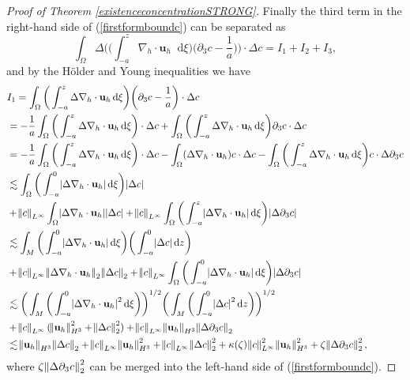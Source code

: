 \documentclass[11pt, a4paper]{article}
\newcommand*\diff{\mathop{}\!\mathrm{d}}
\begin{document}
\begin{proof}[Proof of Theorem \ref{existenceconcentrationSTRONG}]
Finally the third term in the right-hand side of (\ref{firstformboundc}) can be separated as
%
$$\int_\Omega \Delta \bigg ( \bigg ( \int_{-a}^z \nabla_h \cdot \mathbf{u}_h \diff \xi \bigg) \bigg ( \partial_3 c - \frac{1}{a}\bigg) \bigg ) \cdot \Delta c = I_1 + I_2 + I_3,$$
%
and by the H\"older and Young inequalities we have
%
\begin{equation} \label{term3estimateGE_1}
\begin{split}
& I_1 = \int_\Omega \bigg ( \int_{-a}^z \Delta \nabla_h \cdot \mathbf{u}_h \diff \xi \bigg) \bigg ( \partial_3 c - \frac{1}{a}\bigg) \cdot \Delta c \\
& = - \frac{1}{a} \int_\Omega \bigg ( \int_{-a}^z \Delta \nabla_h \cdot \mathbf{u}_h \diff \xi \bigg) \cdot \Delta c + \int_\Omega \bigg ( \int_{-a}^z \Delta \nabla_h \cdot \mathbf{u}_h \diff \xi \bigg) \partial_3 c \cdot \Delta c \\
& = - \frac{1}{a} \int_\Omega \bigg ( \int_{-a}^z \Delta \nabla_h \cdot \mathbf{u}_h \diff \xi \bigg) \cdot \Delta c - \int_\Omega (\Delta \nabla_h \cdot \mathbf{u}_h) c \cdot \Delta c - \int_\Omega \bigg ( \int_{-a}^z \Delta \nabla_h \cdot \mathbf{u}_h \diff \xi \bigg) c \cdot \Delta \partial_3 c \\
& \lesssim \int_\Omega \bigg ( \int_{-a}^0 \abs{\Delta \nabla_h \cdot \mathbf{u}_h} \diff \xi \bigg) \abs{\Delta c} \\
& + \norm{c}_{L^\infty} \int_\Omega \abs{\Delta \nabla_h \cdot \mathbf{u}_h} \abs{\Delta c} + \norm{c}_{L^\infty} \int_\Omega \bigg ( \int_{-a}^z \abs{ \Delta \nabla_h \cdot \mathbf{u}_h} \diff \xi \bigg) \abs{\Delta \partial_3 c} \\
& \lesssim \int_M \bigg ( \int_{-a}^0 \abs{\Delta \nabla_h \cdot \mathbf{u}_h} \diff \xi \bigg) \bigg ( \int_{-a}^0 \abs{\Delta c} \diff z \bigg ) \\
& + \norm{c}_{L^\infty} \norm{\Delta \nabla_h \cdot \mathbf{u}_h}_2 \norm{\Delta c}_2 + \norm{c}_{L^\infty} \int_\Omega \bigg ( \int_{-a}^0 \abs{ \Delta \nabla_h \cdot \mathbf{u}_h} \diff \xi \bigg) \abs{\Delta \partial_3 c} \\
& \lesssim \bigg ( \int_M \bigg ( \int_{-a}^0 \abs{\Delta \nabla_h \cdot \mathbf{u}_h}^2 \diff \xi \bigg) \bigg )^{1/2} \bigg ( \int_M \bigg ( \int_{-a}^0 \abs{\Delta c}^2 \diff z \bigg ) \bigg )^{1/2} \\
& + \norm{c}_{L^\infty} (\norm{\mathbf{u}_h}_{H^3}^2 + \norm{\Delta c}_2^2) + \norm{c}_{L^\infty} \norm{\mathbf{u}_h}_{H^3} \norm{\Delta \partial_3 c}_2 \\
& \lesssim \norm{\mathbf{u}_h}_{H^3} \norm{\Delta c}_2 + \norm{c}_{L^\infty} \norm{\mathbf{u}_h}_{H^3}^2 + \norm{c}_{L^\infty} \norm{\Delta c}_2^2 + \kappa(\zeta) \norm{c}_{L^\infty}^2 \norm{\mathbf{u}_h}_{H^3}^2 + \zeta \norm{\Delta \partial_3 c}_2^2, \raisetag{60pt} \\
\end{split}
\end{equation}
%
where $ \zeta \norm{\Delta \partial_3 c}_2^2$ can be merged into the left-hand side of (\ref{firstformboundc}).


\end{proof}
\end{document}
